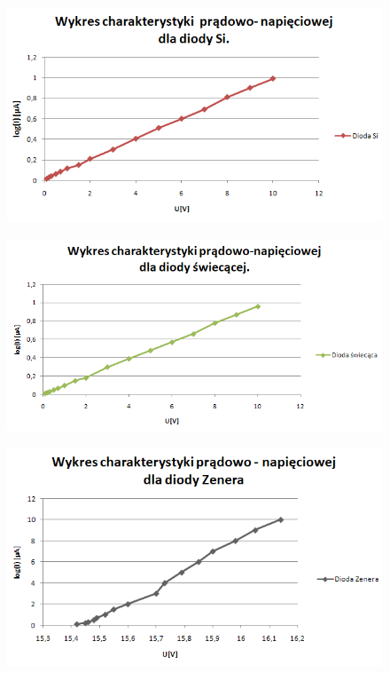 \documentclass[11pt]{article}
\begin{document}
\begin{figure}[H]
    \centering
    \includegraphics[height=0.27\paperheight]{graph4}
    \label{fig:graph4}
\end{figure}

\begin{figure}[H]
    \centering
    \includegraphics[height=0.27\paperheight]{graph5}
    \label{fig:graph5}
\end{figure}

\begin{figure}[H]
    \centering
    \includegraphics[height=0.27\paperheight]{graph6}
    \label{fig:graph6}
\end{figure}
\end{document}
